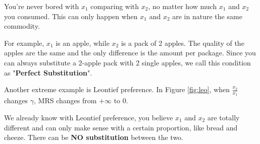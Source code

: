 \documentclass{article}
\begin{document}
\begin{mdframed}[backgroundcolor=blue!20,linecolor=white]
\begin{center}
\label{fig:straight}
\end{center}
\vspace{2mm}

You're never bored with $x_1$ comparing with $x_2$, no matter how much $x_1$ and $x_2$ you consumed. This can only happen when $x_1$ and $x_2$ are in nature the same commodity. 

For example, $x_1$ is an apple, while $x_2$ is a pack of 2 apples. The quality of the apples are the same and the only difference is the amount per package. Since you can always substitute a 2-apple pack with 2 single apples, we call this condition as "\textbf{Perfect Substitution}".

\vspace{6mm}

Another extreme example is Leontief preference.  In Figure \ref{fig:leo}, when $\frac{x_2}{x_1}$ changes $\gamma$, MRS changes from $+\infty$ to $0$.

\begin{center}
\label{fig:leo}
\end{center}

We already know with Leontief preference, you believe $x_1$ and $x_2$ are totally different and can only make sense with a certain proportion, like bread and cheeze. There can be \textbf{NO substitution} between the two.


\end{mdframed}
\end{document}
